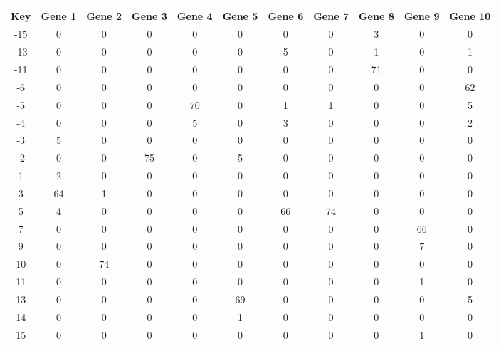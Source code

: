 \begin{tabular}{|c|c|c|c|c|c|c|c|c|c|c|}
\hline
Key & Gene 1 & Gene 2 & Gene 3 & Gene 4 & Gene 5 & Gene 6 & Gene 7 & Gene 8 & Gene 9 & Gene 10 \\
\hline
-15 & 0 & 0 & 0 & 0 & 0 & 0 & 0 & 3 & 0 & 0 \\
-13 & 0 & 0 & 0 & 0 & 0 & 5 & 0 & 1 & 0 & 1 \\
-11 & 0 & 0 & 0 & 0 & 0 & 0 & 0 & 71 & 0 & 0 \\
-6 & 0 & 0 & 0 & 0 & 0 & 0 & 0 & 0 & 0 & 62 \\
-5 & 0 & 0 & 0 & 70 & 0 & 1 & 1 & 0 & 0 & 5 \\
-4 & 0 & 0 & 0 & 5 & 0 & 3 & 0 & 0 & 0 & 2 \\
-3 & 5 & 0 & 0 & 0 & 0 & 0 & 0 & 0 & 0 & 0 \\
-2 & 0 & 0 & 75 & 0 & 5 & 0 & 0 & 0 & 0 & 0 \\
1 & 2 & 0 & 0 & 0 & 0 & 0 & 0 & 0 & 0 & 0 \\
3 & 64 & 1 & 0 & 0 & 0 & 0 & 0 & 0 & 0 & 0 \\
5 & 4 & 0 & 0 & 0 & 0 & 66 & 74 & 0 & 0 & 0 \\
7 & 0 & 0 & 0 & 0 & 0 & 0 & 0 & 0 & 66 & 0 \\
9 & 0 & 0 & 0 & 0 & 0 & 0 & 0 & 0 & 7 & 0 \\
10 & 0 & 74 & 0 & 0 & 0 & 0 & 0 & 0 & 0 & 0 \\
11 & 0 & 0 & 0 & 0 & 0 & 0 & 0 & 0 & 1 & 0 \\
13 & 0 & 0 & 0 & 0 & 69 & 0 & 0 & 0 & 0 & 5 \\
14 & 0 & 0 & 0 & 0 & 1 & 0 & 0 & 0 & 0 & 0 \\
15 & 0 & 0 & 0 & 0 & 0 & 0 & 0 & 0 & 1 & 0 \\
\hline
\end{tabular}